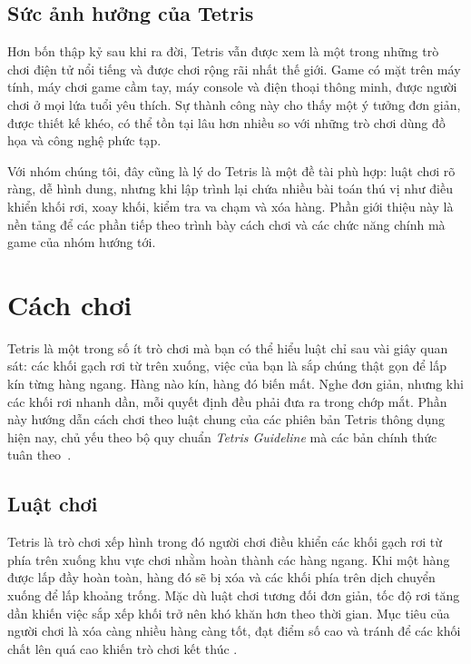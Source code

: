 \documentclass[12pt,a4paper,oneside]{report}
\begin{document}
\subsection{Sức ảnh hưởng của Tetris}

Hơn bốn thập kỷ sau khi ra đời, Tetris vẫn được xem là một trong những trò chơi điện tử nổi tiếng và được chơi rộng rãi nhất thế giới. Game có mặt trên máy tính, máy chơi game cầm tay, máy console và điện thoại thông minh, được người chơi ở mọi lứa tuổi yêu thích. Sự thành công này cho thấy một ý tưởng đơn giản, được thiết kế khéo, có thể tồn tại lâu hơn nhiều so với những trò chơi dùng đồ họa và công nghệ phức tạp.

Với nhóm chúng tôi, đây cũng là lý do Tetris là một đề tài phù hợp: luật chơi rõ ràng, dễ hình dung, nhưng khi lập trình lại chứa nhiều bài toán thú vị như điều khiển khối rơi, xoay khối, kiểm tra va chạm và xóa hàng. Phần giới thiệu này là nền tảng để các phần tiếp theo trình bày cách chơi và các chức năng chính mà game của nhóm hướng tới.

\section{Cách chơi}

Tetris là một trong số ít trò chơi mà bạn có thể hiểu luật chỉ sau vài giây quan sát: các khối gạch rơi từ trên xuống, việc của bạn là sắp chúng thật gọn để lấp kín từng hàng ngang. Hàng nào kín, hàng đó biến mất. Nghe đơn giản, nhưng khi các khối rơi nhanh dần, mỗi quyết định đều phải đưa ra trong chớp mắt. Phần này hướng dẫn cách chơi theo luật chung của các phiên bản Tetris thông dụng hiện nay, chủ yếu theo bộ quy chuẩn \textit{Tetris Guideline} mà các bản chính thức tuân theo~\cite{tetris_wiki,tetris_guideline}.

\subsection{Luật chơi}

Tetris là trò chơi xếp hình trong đó người chơi điều khiển các khối
gạch rơi từ phía trên xuống khu vực chơi nhằm hoàn thành các hàng
ngang. Khi một hàng được lấp đầy hoàn toàn, hàng đó sẽ bị xóa và
các khối phía trên dịch chuyển xuống để lấp khoảng trống. Mặc dù
luật chơi tương đối đơn giản, tốc độ rơi tăng dần khiến việc sắp
xếp khối trở nên khó khăn hơn theo thời gian. Mục tiêu của người
chơi là xóa càng nhiều hàng càng tốt, đạt điểm số cao và tránh để
các khối chất lên quá cao khiến trò chơi kết thúc
\cite{tetris_official,tetris_guideline}.
\end{document}
